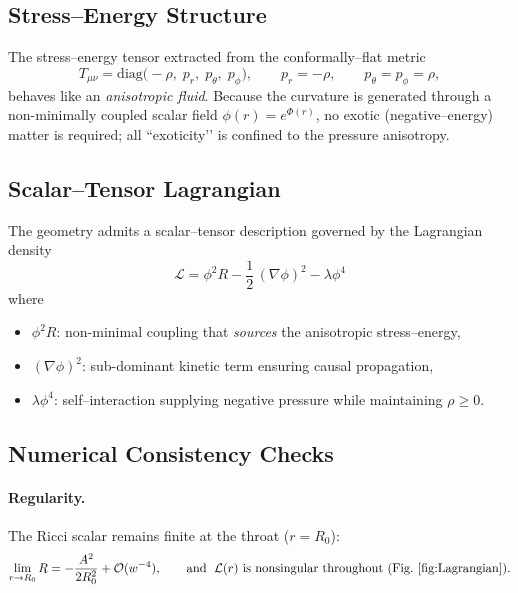 \documentclass[12pt]{article}
\begin{document}
\subsection{Stress–Energy Structure}

The stress–energy tensor extracted from the conformally–flat metric
\[
T_{\mu\nu}
   = \mathrm{diag}\!\bigl(-\rho,\;p_r,\;p_\theta,\;p_\phi\bigr),
   \qquad
   p_r = -\rho,
   \qquad
   p_\theta = p_\phi = \rho ,
\]
behaves like an \emph{anisotropic fluid}.  
Because the curvature is generated through a non-minimally coupled scalar field
\(\phi(r)=e^{\Phi(r)}\), no exotic (negative–energy) matter is required; all “exoticity’’
is confined to the pressure anisotropy.

\subsection{Scalar–Tensor Lagrangian}

The geometry admits a scalar–tensor description governed by the Lagrangian density
\[
\boxed{\;
\mathcal{L}
   = \phi^{2} R
   - \frac{1}{2}\,(\nabla\phi)^2
   - \lambda \phi^{4}
\;}
\]
where

\begin{itemize}
  \item \(\phi^{2}R\): non-minimal coupling that \emph{sources} the anisotropic
        stress–energy,
  \item \((\nabla\phi)^2\): sub-dominant kinetic term ensuring causal propagation,
  \item \(\lambda\phi^{4}\): self–interaction supplying negative pressure
        while maintaining \(\rho\ge 0\).
\end{itemize}

\subsection{Numerical Consistency Checks}

\paragraph{Regularity.}
The Ricci scalar remains finite at the throat (\(r=R_{0}\)):
\[
\lim_{r\to R_{0}} R
   = -\frac{A^{2}}{2R_{0}^{2}}
   + \mathcal{O}(w^{-4}),
\qquad
\text{and }\;
\mathcal{L}(r)\text{ is nonsingular throughout
(Fig.~\ref{fig:Lagrangian}).}
\]
\end{document}
